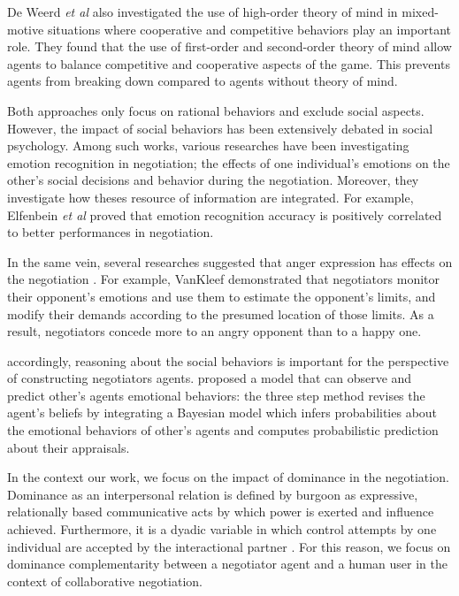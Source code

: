\documentclass[conference, letterpaper]{IEEEtran}
\begin{document}
	De Weerd \textit{et al} \cite{de2013higher} also investigated the use of high-order theory of mind in mixed-motive situations where cooperative and competitive behaviors play an important role. They found that the use of first-order and second-order theory of mind allow agents to balance competitive and cooperative	aspects of the game. This prevents agents from breaking down compared to  agents without theory of mind.
	
	
	Both approaches only focus on rational behaviors and exclude social aspects. However, the impact of social behaviors has been extensively debated in social psychology. Among such works, various researches have been investigating emotion recognition in negotiation; the effects of one individual's	emotions on the other's social decisions and behavior during the negotiation. Moreover, they investigate how theses resource of information are integrated.
	For example, Elfenbein\textit{ et al} \cite{elfenbein2007reading} proved that  emotion recognition accuracy is positively correlated to  better performances in negotiation.
	
	In the same vein, several researches suggested that anger expression has effects on the negotiation \cite{sinaceur2006get,van2010interpersonal,ferguson2004social}. For example, VanKleef \cite{van2004interpersonal} demonstrated that negotiators monitor their opponent's emotions and use them to estimate the opponent's limits, and modify their demands according to the presumed location of those limits. As a result, negotiators concede more to an angry opponent than to a happy one. 
	
	
	accordingly, reasoning about the social behaviors is important for the perspective of constructing negotiators agents. \cite{alfonso2015emotional} proposed a model that can observe and predict other's agents emotional behaviors: the three step method revises the agent's  beliefs by integrating a Bayesian model which infers probabilities about the emotional behaviors of other's agents and computes probabilistic prediction about their appraisals.
	
	
	In the context our work, we focus on the impact of dominance in the negotiation. Dominance as an interpersonal relation is defined by burgoon \cite{burgoon1998nature} as expressive, relationally based communicative acts by which power is exerted and influence achieved. Furthermore, it is a dyadic variable in which control attempts by one individual are accepted by the
	interactional partner \cite{dunbar2005perceptions}. For this reason, we focus on dominance complementarity between a negotiator agent and a human user in the context of collaborative negotiation. 
	
\end{document}
